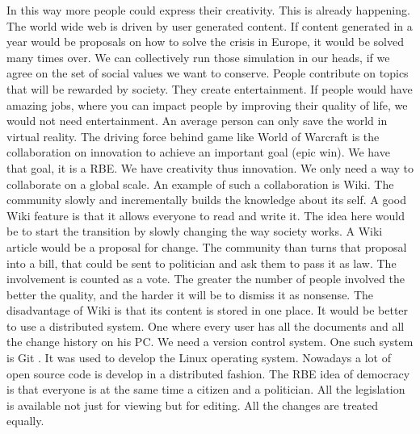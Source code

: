 \documentclass{article}
\begin{document}
In this way more people could express their creativity.
This is already happening.
The world wide web is driven by user generated content.
If content generated in a year would be proposals on how to solve the crisis in Europe, it would be solved many times over.
We can collectively run those simulation in our heads, if we agree on the set of social values we want to conserve.
People contribute on topics that will be rewarded by society.
They create entertainment.
If people would have amazing jobs, where you can impact people by improving their quality of life, we would not need entertainment.
An average person can only save the world in virtual reality.
The driving force behind game like  World of Warcraft \cite{gaming} is the collaboration on innovation to achieve an important goal (epic win).
We have that goal, it is a RBE.
We have creativity thus innovation.
We only need a way to collaborate on a global scale.
An example of such a collaboration is Wiki.
The community slowly and incrementally builds the knowledge about its self.
A good Wiki feature is that it allows everyone to read and write it.
The idea here would be to start the transition by slowly changing the way society works.
A Wiki article would be a proposal for change.
The community than turns that proposal into a bill, that could be sent to politician and ask them to pass it as law.
The involvement is counted as a vote.
The greater the number of people involved the better the quality, and the harder it will be to dismiss it as nonsense.
The disadvantage of Wiki is that its content is stored in one place.
It would be better to use a distributed system.
One where every user has all the documents and all the change history on his PC.
We need a version control system.
One such system is Git \cite{git}.
It was used to develop the Linux operating system.
Nowadays a lot of open source code is develop in a distributed fashion.
The RBE idea of democracy is that everyone is at the same time a citizen and a politician.
All the legislation is available not just for viewing but for editing.
All the changes are treated equally.
\end{document}
